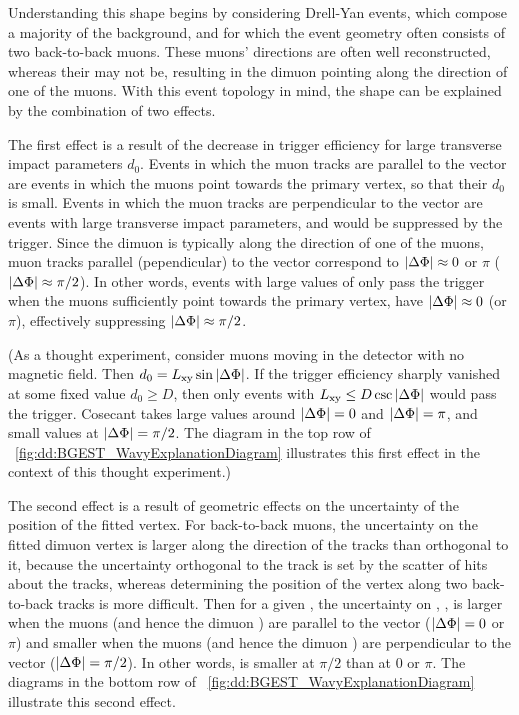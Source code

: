Understanding this shape begins by considering Drell-Yan events, which compose a majority of the background, and for which the event geometry often consists of two back-to-back muons.
These muons' directions are often well reconstructed, whereas their \pT may not be, resulting in the dimuon \pT pointing along the direction of one of the muons.
With this event topology in mind, the shape can be explained by the combination of two effects.

The first effect is a result of the decrease in trigger efficiency for large transverse impact parameters $d_{0}$.
Events in which the muon tracks are parallel to the \Lxy vector are events in which the muons point towards the primary vertex, so that their $d_0$ is small.
Events in which the muon tracks are perpendicular to the \Lxy vector are events with large transverse impact parameters, and would be suppressed by the trigger.
Since the dimuon \pT is typically along the direction of one of the muons, muon tracks parallel (pependicular) to the \Lxy vector correspond to $|\Delta\Phi| \approx 0$ or $\pi$ ($|\Delta\Phi| \approx \pi/2$).
In other words, events with large values of \Lxy only pass the trigger when the muons sufficiently point towards the primary vertex, \ie have $|\Delta\Phi| \approx 0$ (or $\pi$), effectively suppressing $|\Delta\Phi| \approx \pi/2$.

(As a thought experiment, consider muons moving in the detector with no magnetic field. Then $d_0 = L_{\mathrm{xy}} \sin{\ensuremath{|\Delta\Phi|}}$.
If the trigger efficiency sharply vanished at some fixed value $d_0 \geq D$, then only events with $L_{\mathrm{xy}} \leq D \csc{\ensuremath{|\Delta\Phi|}}$ would pass the trigger.
Cosecant takes large values around $|\Delta\Phi| = 0$ and $|\Delta\Phi| = \pi$, and small values at $|\Delta\Phi| = \pi/2$.
The diagram in the top row of \Fig~\ref{fig:dd:BGEST_WavyExplanationDiagram} illustrates this first effect in the context of this thought experiment.)

The second effect is a result of geometric effects on the uncertainty of the position of the fitted vertex.
For back-to-back muons, the uncertainty on the fitted dimuon vertex is larger along the direction of the tracks than orthogonal to it, because the uncertainty orthogonal to the track is set by the scatter of hits about the tracks, whereas determining the position of the vertex along two back-to-back tracks is more difficult.
Then for a given \Lxy, the uncertainty on \Lxy, \LxyErr, is larger when the muons (and hence the dimuon \pT) are parallel to the \Lxy vector (\ie $|\Delta\Phi| = 0$ or $\pi$) and smaller when the muons (and hence the dimuon \pT) are perpendicular to the \Lxy vector (\ie $|\Delta\Phi| = \pi/2$).
In other words, \LxyErr is smaller at $\pi/2$ than at 0 or $\pi$.
The diagrams in the bottom row of \Fig~\ref{fig:dd:BGEST_WavyExplanationDiagram} illustrate this second effect.

